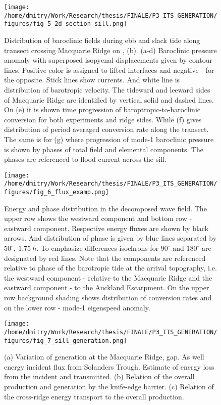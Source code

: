 \documentclass[12pt]{article}
\begin{document}
\begin{figure}
	\centering
	\texttt{[image: /home/dmitry/Work/Research/thesis/FINALE/P3\_ITS\_GENERATION/figures/fig\_5\_2d\_section\_sill.png]}
	\caption{Distribution of baroclinic fields during ebb and slack tide along transect crossing 
	Macquarie Ridge on , (b). (a-d) Baroclinic pressure anomaly with superposed 
	isopycnal displacements given by contour lines. Positive color is assigned to lifted interfaces 
	and negative - for the opposite. Stick lines show currents. And white line is distribution 
	of barotropic velocity. The tideward and leeward sides of Macquarie Ridge are identified by 
	vertical solid and dashed lines. On (e) it is shown time progression of 
	baroptropic-to-baroclinic conversion for both experiments and ridge sides. While (f) gives 
	distribution of period averaged conversion rate along the transect. The same is for (g) where 
	progression of mode-1 baroclinic pressure is shown by phases of total field and elemental 
	components. The phases are referenced to flood current across the sill.}
	\label{C3.fig:gen_2d}
\end{figure}

\begin{figure}
	\centering
	\texttt{[image: /home/dmitry/Work/Research/thesis/FINALE/P3\_ITS\_GENERATION/figures/fig\_6\_flux\_examp.png]}
	\caption{Energy and phase distribution in the decomposed wave field. The upper row shows the 
	westward component and bottom row - eastward component. Respective energy fluxes are shown by 
	black arrows. And distribution of phase is given by blue lines separated by 
	$50^{\circ},~1.75~h$. To emphasize differences isochrons for $90^{\circ}$ and $180^{\circ}$ are 
	designated by red lines. Note that the components are referenced relative to phase of the 
	barotropic tide at the arrival topography, i.e. the westward component  - relative to the 
	Macquarie Ridge and the eastward component - to the Auckland Escarpment. On the upper row 
	background shading shows distribution of conversion rates and on the lower row - mode-1 
	eigenspeed anomaly.}
	\label{C3.fig:wv_fld_dist}
\end{figure}

\begin{figure}
	\centering
	\texttt{[image: /home/dmitry/Work/Research/thesis/FINALE/P3\_ITS\_GENERATION/figures/fig\_7\_sill\_generation.png]}
	\caption{(a) Variation of generation at the Macquarie Ridge, gap. As well energy incident flux 
	from Solanders Trough. Estimate of energy loss from the incident and transmitted. (b) Relation 
	of the overall production and generation by the knife-edge barrier. (c) Relation of the 
	cross-ridge energy transport to the overall production.}
	\label{C3.fig:gen_sill}
\end{figure}
\end{document}
